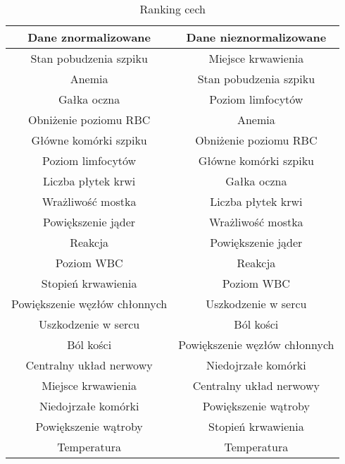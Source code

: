 	\begin{table}[h!]
		\centering
		\begin{tabular}{|| c | c ||} 
			\hline
			Dane znormalizowane & Dane nieznormalizowane \\ [0.5ex] 
			\hline\hline
			Stan pobudzenia szpiku & Miejsce krwawienia \\ 
			Anemia & Stan pobudzenia szpiku \\
			Gałka oczna & Poziom limfocytów \\
			Obniżenie poziomu RBC & Anemia \\
			Główne komórki szpiku & Obniżenie poziomu RBC \\
			Poziom limfocytów & Główne komórki szpiku \\
			Liczba płytek krwi & Gałka oczna \\
			Wrażliwość mostka & Liczba płytek krwi \\
			Powiększenie jąder & Wrażliwość mostka \\
			Reakcja & Powiększenie jąder \\
			Poziom WBC & Reakcja \\
			Stopień krwawienia & Poziom WBC \\
			Powiększenie węzłów chłonnych & Uszkodzenie w sercu \\
			Uszkodzenie w sercu & Ból kości \\
			Ból kości & Powiększenie węzłów chłonnych \\
			Centralny układ nerwowy & Niedojrzałe komórki \\
			Miejsce krwawienia & Centralny układ nerwowy \\
			Niedojrzałe komórki & Powiększenie wątroby\\
			Powiększenie wątroby & Stopień krwawienia \\
			Temperatura & Temperatura \\ [1ex] 
			\hline
		\end{tabular}
		\caption{Ranking cech}
		\label{3}
	\end{table}